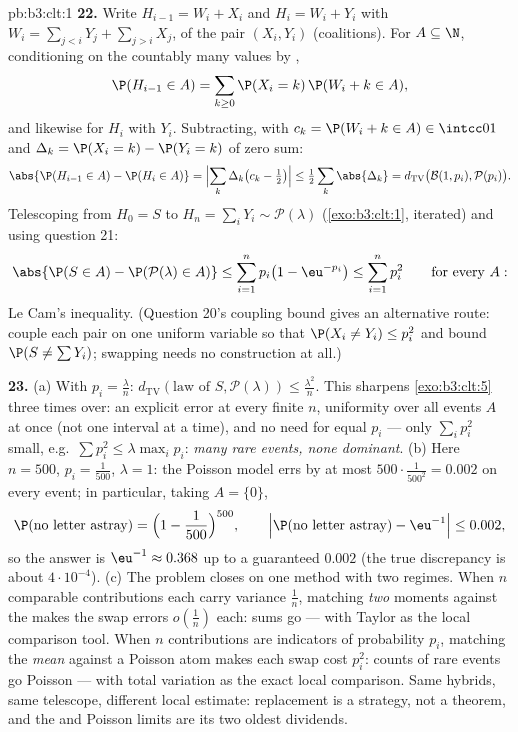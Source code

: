 \begin{solution}{pb:b3:clt:1}
\textbf{22.} Write $H_{i-1} = W_i + X_i$ and $H_i = W_i +
Y_i$ with $W_i = \sum_{j<i}Y_j + \sum_{j>i}X_j$,
 of the pair $(X_i, Y_i)$ (coalitions). For $A
\subseteq \N$, conditioning on the countably many values
by ,
\[
\P(H_{i-1} \in A) = \sum_{k\geq0}\P(X_i = k)\,\P(W_i + k
\in A),
\]
and likewise for $H_i$ with $Y_i$. Subtracting, with $c_k
= \P(W_i + k \in A) \in \intcc01$ and $\Delta_k = \P(X_i =
k) - \P(Y_i = k)$ of zero sum:
\[
\abs{\P(H_{i-1} \in A) - \P(H_i \in A)} =
\Bigl|\sum_k\Delta_k\bigl(c_k - \tfrac12\bigr)\Bigr| \leq
\tfrac12\sum_k\abs{\Delta_k} =
d_{\mathrm{TV}}\bigl(\mathcal B(1, p_i), \mathcal
P(p_i)\bigr) .
\]
Telescoping from $H_0 = S$ to $H_n = \sum_iY_i \sim
\mathcal P(\lambda)$ (\cref{exo:b3:clt:1}, iterated) and
using question 21:
\[
\abs{\P(S \in A) - \P(\mathcal P(\lambda) \in A)} \leq
\sum_{i=1}^np_i\bigl(1 - \eu^{-p_i}\bigr) \leq
\sum_{i=1}^np_i^2
\qquad\text{for every } A :
\]
Le Cam's inequality. (Question 20's coupling bound gives an
alternative route: couple each pair on one uniform
variable so that $\P(X_i \neq Y_i) \leq p_i^2$ and bound
$\P(S \neq \sum Y_i)$; swapping needs no construction at
all.)

\textbf{23.} (a) With $p_i = \frac\lambda n$:
$d_{\mathrm{TV}}(\text{law of }S, \mathcal P(\lambda))
\leq \frac{\lambda^2}n$. This sharpens
\cref{exo:b3:clt:5} three times over: an explicit error at
every finite $n$, uniformity over all events $A$ at once
(not one interval at a time), and no need for equal
$p_i$ --- only $\sum_ip_i^2$ small, e.g.\ $\sum p_i^2 \leq
\lambda\max_ip_i$: \emph{many rare events, none
dominant}. (b) Here $n = 500$, $p_i = \frac1{500}$,
$\lambda = 1$: the Poisson model errs by at most
$500\cdot\frac1{500^2} = 0.002$ on every event; in
particular, taking $A = \{0\}$,
\[
\P(\text{no letter astray}) = \Bigl(1 -
\frac1{500}\Bigr)^{500},
\qquad
\Bigl|\P(\text{no letter astray}) - \eu^{-1}\Bigr| \leq
0.002,
\]
so the answer is $\eu^{-1} \approx 0.368$ up to a
guaranteed $0.002$ (the true discrepancy is about
$4\cdot10^{-4}$). (c) The
problem closes on one method with two regimes. When $n$
comparable contributions each carry variance
$\frac1n$, matching \emph{two} moments against the
 makes the swap errors $o(\frac1n)$ each: sums go
 --- with Taylor as the local comparison tool.
When $n$ contributions are indicators of probability
$p_i$, matching the \emph{mean} against a Poisson atom
makes each swap cost $p_i^2$: counts of rare events go
Poisson --- with total variation as the exact local
comparison. Same hybrids, same telescope, different local
estimate: replacement is a strategy, not a theorem, and
the  and Poisson limits are its two oldest
dividends.


\end{solution}
